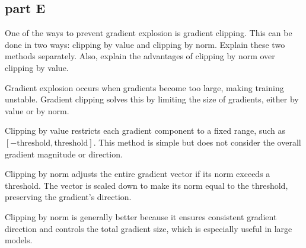 \subsection{part E}
One of the ways to prevent gradient explosion is gradient clipping. This can be done in two ways: clipping by value and clipping by norm. Explain these two methods separately. Also, explain the advantages of clipping by norm over clipping by value.
\begin{qsolve}
  \begin{qsolve}[]
    Gradient explosion occurs when gradients become too large, making training unstable. Gradient clipping solves this by limiting the size of gradients, either by value or by norm. 

    Clipping by value restricts each gradient component to a fixed range, such as \([-\text{threshold}, \text{threshold}]\). This method is simple but does not consider the overall gradient magnitude or direction.
    
    Clipping by norm adjusts the entire gradient vector if its norm exceeds a threshold. The vector is scaled down to make its norm equal to the threshold, preserving the gradient's direction.
    
    Clipping by norm is generally better because it ensures consistent gradient direction and controls the total gradient size, which is especially useful in large models.      
  \end{qsolve}
\end{qsolve}
